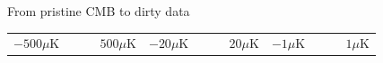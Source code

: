 \documentclass[table]{beamer}
\begin{document}
\begin{frame}{From pristine CMB to dirty data}
\begin{tabular}{ccc}
	\\
	{\footnotesize $-500\mu$K\enskip\includegraphics[width=12mm,height=2mm]{colorbar.png}\enskip$500\mu$K} &
	{\footnotesize $-20\mu$K\enskip\includegraphics[width=12mm,height=2mm]{colorbar.png}\enskip$20\mu$K} &
	{\footnotesize $-1\mu$K\enskip\includegraphics[width=12mm,height=2mm]{colorbar.png}\enskip$1\mu$K}
\end{tabular}\hspace*{-5mm}
\end{frame}
\end{document}
